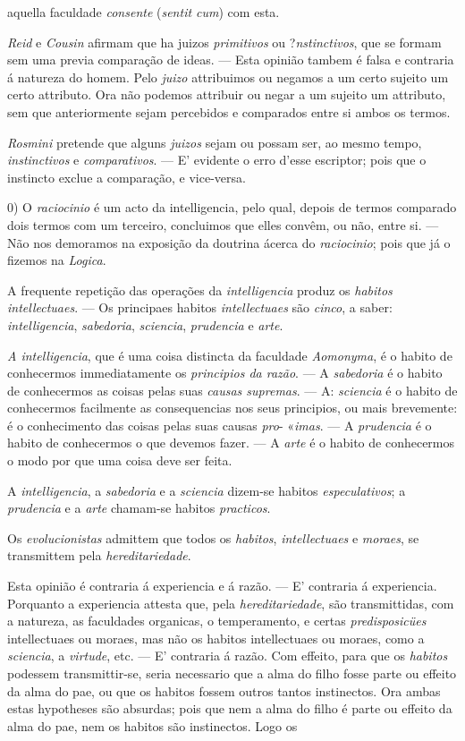 aquella faculdade \emph{consente} (\emph{sentit cum}) com esta.\par \emph{Reid} e \emph{Cousin} afirmam que ha juizos \emph{primitivos} ou ?\emph{nstinctivos}, que se formam sem uma previa comparação de ideas. --- Esta opinião tambem é falsa e contraria á natureza do homem. Pelo \emph{juizo} attribuimos ou negamos a um certo sujeito um certo attributo. Ora não podemos attribuir ou negar a um sujeito um attributo, sem que anteriormente sejam percebidos e comparados entre si ambos os termos.\par \emph{Rosmini} pretende que alguns \emph{juizos} sejam ou possam ser, ao mesmo tempo, \emph{instinctivos} e \emph{comparativos}. --- E' evidente o erro d'esse escriptor; pois que o instincto exclue a comparação, e vice-versa.\par 0) O \emph{raciocinio} é um acto da intelligencia, pelo qual, depois de termos comparado dois termos com um terceiro, concluimos que elles convêm, ou não, entre si. --- Não nos demoramos na exposição da doutrina ácerca do \emph{raciocinio}; pois que já o fizemos na \emph{Logica}.\par *\par A frequente repetição das operações da \emph{intelligencia} produz os \emph{habitos intellectuaes}. --- Os principaes habitos \emph{intellectuaes} são \emph{cinco}, a saber: \emph{intelligencia}, \emph{sabedoria}, \emph{sciencia}, \emph{prudencia} e \emph{arte}.\par \emph{A intelligencia}, que é uma coisa distincta da faculdade \emph{Aomonyma}, é o habito de conhecermos immediatamente os \emph{principios da razão}. --- A \emph{sabedoria} é o habito de conhecermos as coisas pelas suas \emph{causas supremas}. --- A: \emph{sciencia} é o habito de conhecermos facilmente as consequencias nos seus principios, ou mais brevemente: é o conhecimento das coisas pelas suas causas \emph{pro}- «\emph{imas}. --- A \emph{prudencia} é o habito de conhecermos o que devemos fazer. --- A \emph{arte} é o habito de conhecermos o modo por que uma coisa deve ser feita.\par A \emph{intelligencia}, a \emph{sabedoria} e a \emph{sciencia} dizem-se habitos \emph{especulativos}; a \emph{prudencia} e a \emph{arte} chamam-se habitos \emph{practicos}.\par Os \emph{evolucionistas} admittem que todos os \emph{habitos}, \emph{intellectuaes} e \emph{moraes}, se transmittem pela \emph{hereditariedade}.\par Esta opinião é contraria á experiencia e á razão. --- E' contraria á experiencia. Porquanto a experiencia attesta que, pela \emph{hereditariedade}, são transmittidas, com a natureza, as faculdades organicas, o temperamento, e certas \emph{predisposicües} intellectuaes ou moraes, mas não os habitos intellectuaes ou moraes, como a \emph{sciencia}, a \emph{virtude}, etc. --- E' contraria á razão. Com effeito, para que os \emph{habitos} podessem transmittir-se, seria necessario que a alma do filho fosse parte ou effeito da alma do pae, ou que os habitos fossem outros tantos instinectos. Ora ambas estas hypotheses são absurdas; pois que nem a alma do filho é parte ou effeito da alma do pae, nem os habitos são instinectos. Logo os 